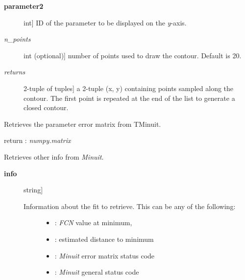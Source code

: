 \documentclass[a4paper,10pt,english]{sphinxmanual}
\begin{document}
\begin{fulllineitems}
\begin{fulllineitems}
\begin{description}
\item[{\textbf{parameter2}}] \leavevmode{[}int{]}
ID of the parameter to be displayed on the \emph{y}-axis.

\item[{\emph{n\_points}}] \leavevmode{[}int (optional){]}
number of points used to draw the contour. Default is 20.

\item[{\emph{returns}}] \leavevmode{[}2-tuple of tuples{]}
a 2-tuple (x, y) containing  points sampled
along the contour. The first point is repeated at the end
of the list to generate a closed contour.

\end{description}

\end{fulllineitems}


\begin{fulllineitems}
\label{index:kafe.minuit.Minuit.get_error_matrix}
Retrieves the parameter error matrix from TMinuit.

return : \emph{numpy.matrix}

\end{fulllineitems}


\begin{fulllineitems}
\label{index:kafe.minuit.Minuit.get_fit_info}
Retrieves other info from \emph{Minuit}.
\begin{description}
\item[{\textbf{info}}] \leavevmode{[}string{]}\begin{description}
\item[{Information about the fit to retrieve. This can be any of the following:}] \leavevmode\begin{itemize}
\item {} 
: \emph{FCN} value at minimum,

\item {} 
: estimated distance to minimum

\item {} 
: \emph{Minuit} error matrix status code

\item {} 
: \emph{Minuit} general status code


\end{itemize}
\end{description}
\end{description}
\end{fulllineitems}
\end{fulllineitems}
\end{document}
